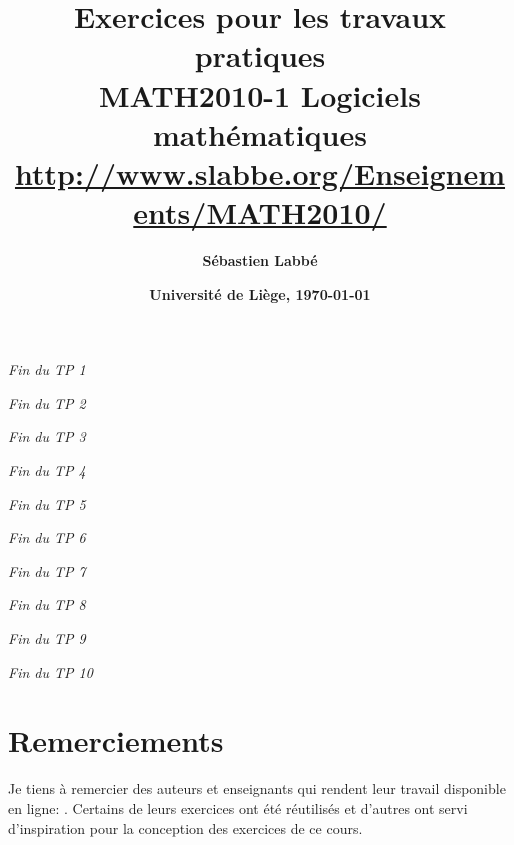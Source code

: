 

\usepackage{titling}
\setlength{\droptitle}{-6em}   %

\thispagestyle{empty}
\title{\sffamily\bfseries
    Exercices pour les travaux pratiques\\[3mm]
    MATH2010-1 Logiciels mathématiques\\[2mm]
    \normalsize\url{http://www.slabbe.org/Enseignements/MATH2010/}}
\author{\sffamily\bfseries Sébastien Labbé}
\date{\sffamily\bfseries Université de Liège, \today}



\maketitle




\hfill{\it Fin du TP 1}


\hfill{\it Fin du TP 2}



\hfill{\it Fin du TP 3}


\hfill{\it Fin du TP 4}

\hfill{\it Fin du TP 5}

\hfill{\it Fin du TP 6}



\hfill{\it Fin du TP 7}


\hfill{\it Fin du TP 8}



\hfill{\it Fin du TP 9}

\hfill{\it Fin du TP 10}

\section*{Remerciements}

Je tiens à remercier des auteurs et enseignants qui rendent leur travail
disponible en ligne:
\cite{albenque_maple_2006,
jolivet_math_2014,
knight_computing,
massart_programmation_2015,
mazur_prime_2015}.
Certains de leurs exercices ont été réutilisés et d'autres ont servi
d'inspiration pour la conception des exercices de ce cours.

